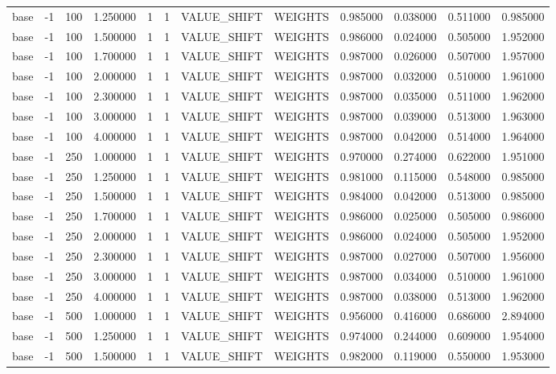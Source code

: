 \begin{tabular}{lrrrllllrrrr}
base & -1 & 100 & 1.250000 & 1 & 1 & VALUE_SHIFT & WEIGHTS & 0.985000 & 0.038000 & 0.511000 & 0.985000 \\
base & -1 & 100 & 1.500000 & 1 & 1 & VALUE_SHIFT & WEIGHTS & 0.986000 & 0.024000 & 0.505000 & 1.952000 \\
base & -1 & 100 & 1.700000 & 1 & 1 & VALUE_SHIFT & WEIGHTS & 0.987000 & 0.026000 & 0.507000 & 1.957000 \\
base & -1 & 100 & 2.000000 & 1 & 1 & VALUE_SHIFT & WEIGHTS & 0.987000 & 0.032000 & 0.510000 & 1.961000 \\
base & -1 & 100 & 2.300000 & 1 & 1 & VALUE_SHIFT & WEIGHTS & 0.987000 & 0.035000 & 0.511000 & 1.962000 \\
base & -1 & 100 & 3.000000 & 1 & 1 & VALUE_SHIFT & WEIGHTS & 0.987000 & 0.039000 & 0.513000 & 1.963000 \\
base & -1 & 100 & 4.000000 & 1 & 1 & VALUE_SHIFT & WEIGHTS & 0.987000 & 0.042000 & 0.514000 & 1.964000 \\
base & -1 & 250 & 1.000000 & 1 & 1 & VALUE_SHIFT & WEIGHTS & 0.970000 & 0.274000 & 0.622000 & 1.951000 \\
base & -1 & 250 & 1.250000 & 1 & 1 & VALUE_SHIFT & WEIGHTS & 0.981000 & 0.115000 & 0.548000 & 0.985000 \\
base & -1 & 250 & 1.500000 & 1 & 1 & VALUE_SHIFT & WEIGHTS & 0.984000 & 0.042000 & 0.513000 & 0.985000 \\
base & -1 & 250 & 1.700000 & 1 & 1 & VALUE_SHIFT & WEIGHTS & 0.986000 & 0.025000 & 0.505000 & 0.986000 \\
base & -1 & 250 & 2.000000 & 1 & 1 & VALUE_SHIFT & WEIGHTS & 0.986000 & 0.024000 & 0.505000 & 1.952000 \\
base & -1 & 250 & 2.300000 & 1 & 1 & VALUE_SHIFT & WEIGHTS & 0.987000 & 0.027000 & 0.507000 & 1.956000 \\
base & -1 & 250 & 3.000000 & 1 & 1 & VALUE_SHIFT & WEIGHTS & 0.987000 & 0.034000 & 0.510000 & 1.961000 \\
base & -1 & 250 & 4.000000 & 1 & 1 & VALUE_SHIFT & WEIGHTS & 0.987000 & 0.038000 & 0.513000 & 1.962000 \\
base & -1 & 500 & 1.000000 & 1 & 1 & VALUE_SHIFT & WEIGHTS & 0.956000 & 0.416000 & 0.686000 & 2.894000 \\
base & -1 & 500 & 1.250000 & 1 & 1 & VALUE_SHIFT & WEIGHTS & 0.974000 & 0.244000 & 0.609000 & 1.954000 \\
base & -1 & 500 & 1.500000 & 1 & 1 & VALUE_SHIFT & WEIGHTS & 0.982000 & 0.119000 & 0.550000 & 1.953000 \\

\end{tabular}
